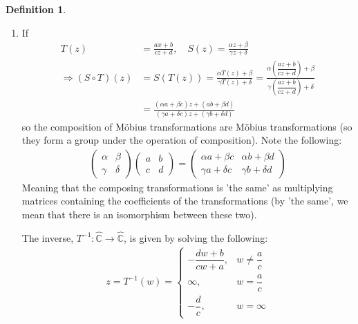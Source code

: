 \documentclass[12pt, a4paper]{article}
\theoremstyle{plain}
\theoremstyle{definition}
\newtheorem{definition}{Definition} %
\begin{document}
\begin{definition}
\begin{enumerate}
					\item If
						\begin{align*}
							T(z) &= \frac{ax+b}{cz+d}, \quad S(z) = \frac{\alpha z+\beta}{\gamma z + \delta}\\
							\Rightarrow (S\circ T)(z) &=
							S(T(z)) = 
							\frac{\alpha T(z) + \beta}{\gamma T(z) + \delta} = 
							\frac{\alpha\left(\dfrac{az+b}{cz+d}\right)+\beta}{\gamma\left(\dfrac{az+b}{cz+d}\right) + \delta}\\ &=
							\frac{(\alpha a + \beta c)z + (ab+\beta d)}{(\gamma a + \delta c)z + (\gamma b + \delta d)}
						\end{align*}
						so the composition of Möbius transformations are Möbius transformations (so they form a group under the operation of composition). Note the following:
						\begin{align*}
							\begin{pmatrix}
								\alpha & \beta\\
								\gamma & \delta
							\end{pmatrix}
							\begin{pmatrix}
								a & b\\
								c & d
							\end{pmatrix} = 
							\begin{pmatrix}
								\alpha a + \beta c & \alpha b + \beta d\\
								\gamma a + \delta c & \gamma b + \delta d
							\end{pmatrix}
						\end{align*}
						Meaning that the composing transformations is 'the same' as multiplying matrices containing the coefficients of the transformations (by 'the same', we mean that there is an isomorphism between these two).

						The inverse, $T^{-1}:\hat{\mathbb{C}}\to \hat{\mathbb{C}}$, is given by solving the following:
						\begin{align*}
							z = T^{-1}(w) =
							\begin{cases}
								- \dfrac{dw+b}{cw+a},  &w\not = \dfrac{a}{c}\\[0.5cm]
								\infty,  &w = \dfrac{a}{c}\\
								- \dfrac{d}{c},  &w = \infty
							\end{cases}
						\end{align*}\\
				\end{enumerate}
			\end{definition}
\end{document}
